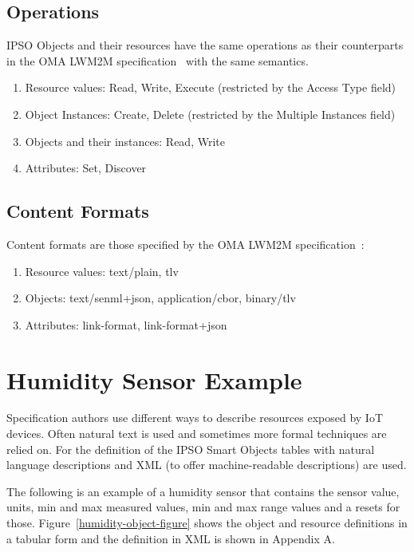 \documentclass[peerreview, a4paper, 7pt]{IEEEtran}
\begin{document}
\subsection{Operations}

IPSO Objects and their resources have the same operations as their counterparts in the OMA LWM2M specification~\cite{lwm2m} with the same semantics.

\begin{enumerate}
\item Resource values: Read, Write, Execute (restricted by the Access Type field)
\item Object Instances: Create, Delete (restricted by the Multiple Instances field)
\item Objects and their instances: Read, Write
\item Attributes: Set, Discover
\end{enumerate}

\subsection{Content Formats}

Content formats are those specified by the OMA LWM2M specification~\cite{lwm2m}:
\begin{enumerate}
\item Resource values: text/plain, tlv
\item Objects: text/senml+json, application/cbor, binary/tlv
\item Attributes: link-format, link-format+json
\end{enumerate}

\section{Humidity Sensor Example}

Specification authors use different ways to describe resources exposed by IoT devices. Often natural text is used and sometimes more formal techniques are relied on. For the definition of the IPSO Smart Objects tables with natural language descriptions and XML (to offer machine-readable descriptions) are used.

The following is an example of a humidity sensor that contains the sensor value, units, min and max measured values, min and max range values and a resets for those. Figure~\ref{humidity-object-figure} shows the object and resource definitions in a tabular form and the definition in XML is shown in Appendix A. 
\end{document}
